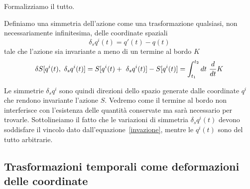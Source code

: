     Formalizziamo il tutto.

    \begin{definition}
        Definiamo una simmetria dell'azione come una trasformazione qualsiasi, non necessariamente infinitesima, delle coordinate spaziali 
    \begin{equation}\label{simmazione}
        \delta_s q^i(t) = q'(t) - q(t)
    \end{equation} 
        tale che l'azione sia invariante a meno di un termine al bordo $K$
    \begin{equation} \label{invazione}
        \delta S[q^i(t), ~\delta_s q^i(t)] = S[q^i(t) + ~\delta_s q^i(t)] - S[q^i(t)] = \int_{t_1}^{t_2}dt~ \frac{d}{dt} K
    \end{equation}
    \end{definition}    
    Le simmetrie $\delta_s q^i$ sono quindi direzioni dello spazio generate dalle coordinate $q^i$ che rendono invariante l'azione $S$. Vedremo come il termine al bordo non interferisce con l'esistenza delle quantità conservate ma sarà necessario per trovarle. Sottolineiamo il fatto che le variazioni di simmetria $\delta_s q^i(t)$ devono soddisfare il vincolo dato dall'equazione~\eqref{invazione}, mentre le $q^i(t)$ sono del tutto arbitrarie.

\subsection{Trasformazioni temporali come deformazioni delle coordinate}

